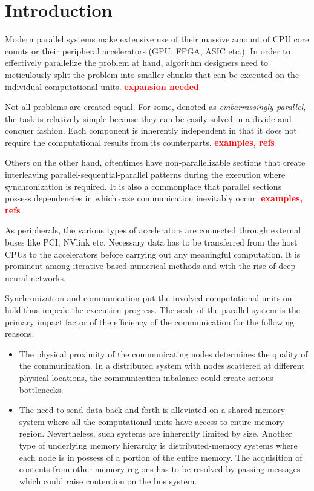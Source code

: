 \chapter{Introduction}
\label{chap:introduction}
Modern parallel systems make extensive use of their massive amount of CPU core 
counts or their peripheral accelerators (GPU, FPGA, ASIC etc.). In order to 
effectively parallelize the problem at hand, algorithm designers need to 
meticulously split the problem into smaller chunks that can be executed on the 
individual computational units. \textbf{\textcolor{red}{expansion needed}}

Not all problems are created equal. For some, denoted as \textit{embarrassingly parallel}, 
the task is relatively simple because they can be easily solved in a divide and 
conquer fashion. Each component is inherently independent in that it does not 
require the computational results from its counterparts. 
\textbf{\textcolor{red}{examples, refs}}

Others on the other hand, oftentimes have non-parallelizable sections that 
create interleaving parallel-sequential-parallel patterns during the execution where 
synchronization is required. It is also a commonplace that parallel sections 
possess dependencies in which case communication inevitably occur.
\textbf{\textcolor{red}{examples, refs}}

As peripherals, the various types of accelerators are connected through external 
buses like PCI, NVlink etc. Necessary data has to be transferred from the host 
CPUs to the accelerators before carrying out any meaningful computation. It is 
prominent among iterative-based numerical methods and with the rise of deep 
neural networks.

Synchronization and communication put the involved computational units on hold 
thus impede the execution progress. The scale of the parallel system is the 
primary impact factor of the efficiency of the communication for the following 
reasons.
\begin{itemize}
    \item The physical proximity of the communicating nodes determines the 
        quality of the communication. In a distributed system with nodes scattered 
        at different physical locations, the communication inbalance could create 
        serious bottlenecks.
    \item The need to send data back and forth is alleviated on a shared-memory 
        system where all the computational units have access to entire memory region. 
        Nevertheless, such systems are inherently limited by size. Another type 
        of underlying memory hierarchy is distributed-memory systems where each 
        node is in possess of a portion of the entire memory. The acquisition 
        of contents from other memory regions has to be resolved by passing 
        messages which could raise contention on the bus system.
\end{itemize}
 

